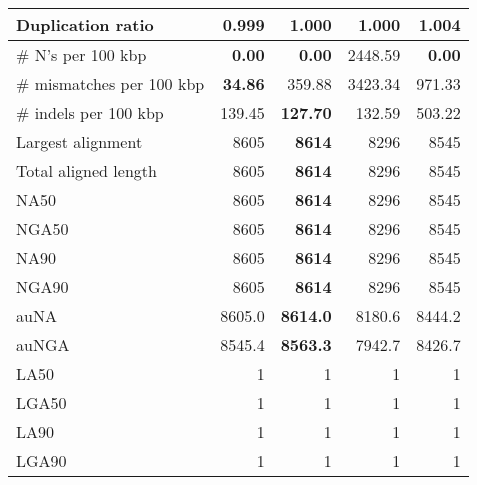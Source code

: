 \documentclass[12pt,a4paper]{article}
\begin{document}
\begin{table}[ht]
\begin{center}
\begin{tabular}{|l*{4}{|r}|}
Duplication ratio & {\bf 0.999} & 1.000 & 1.000 & 1.004 \\ \hline
\# N's per 100 kbp & {\bf 0.00} & {\bf 0.00} & 2448.59 & {\bf 0.00} \\ \hline
\# mismatches per 100 kbp & {\bf 34.86} & 359.88 & 3423.34 & 971.33 \\ \hline
\# indels per 100 kbp & 139.45 & {\bf 127.70} & 132.59 & 503.22 \\ \hline
Largest alignment & 8605 & {\bf 8614} & 8296 & 8545 \\ \hline
Total aligned length & 8605 & {\bf 8614} & 8296 & 8545 \\ \hline
NA50 & 8605 & {\bf 8614} & 8296 & 8545 \\ \hline
NGA50 & 8605 & {\bf 8614} & 8296 & 8545 \\ \hline
NA90 & 8605 & {\bf 8614} & 8296 & 8545 \\ \hline
NGA90 & 8605 & {\bf 8614} & 8296 & 8545 \\ \hline
auNA & 8605.0 & {\bf 8614.0} & 8180.6 & 8444.2 \\ \hline
auNGA & 8545.4 & {\bf 8563.3} & 7942.7 & 8426.7 \\ \hline
LA50 & 1 & 1 & 1 & 1 \\ \hline
LGA50 & 1 & 1 & 1 & 1 \\ \hline
LA90 & 1 & 1 & 1 & 1 \\ \hline
LGA90 & 1 & 1 & 1 & 1 \\ \hline
\end{tabular}
\end{center}
\end{table}
\end{document}
